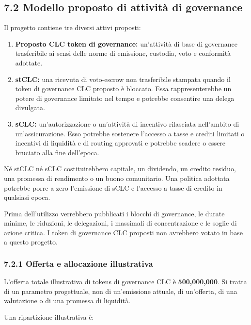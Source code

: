 \documentclass[11pt]{article}
\begin{document}
\subsection*{7.2 Modello proposto di attività di governance}

Il progetto contiene tre diversi attivi proposti:

\begin{enumerate}[leftmargin=*]
\item \textbf{Proposto CLC token di governance:} un'attività di base di governance trasferibile ai sensi delle norme di emissione, custodia, voto e conformità adottate.
\item \textbf{stCLC:} una ricevuta di voto-escrow non trasferibile stampata quando il token di governance CLC proposto è bloccato. Essa rappresenterebbe un potere di governance limitato nel tempo e potrebbe consentire una delega divulgata.
\item \textbf{sCLC:} un'autorizzazione o un'attività di incentivo rilasciata nell'ambito di un'assicurazione. Esso potrebbe sostenere l'accesso a tasse e crediti limitati o incentivi di liquidità e di routing approvati e potrebbe scadere o essere bruciato alla fine dell'epoca.
\end{enumerate}
Né stCLC né sCLC costituirebbero capitale, un dividendo, un credito residuo, una promessa di rendimento o un buono comunitario. Una politica adottata potrebbe porre a zero l'emissione di sCLC e l'accesso a tasse di credito in qualsiasi epoca.

Prima dell'utilizzo verrebbero pubblicati i blocchi di governance, le durate minime, le riduzioni, le delegazioni, i massimali di concentrazione e le soglie di azione critica. I token di governance CLC proposti non avrebbero votato in base a questo progetto.

\subsubsection*{7.2.1 Offerta e allocazione illustrativa}

L'offerta totale illustrativa di tokens di governance CLC è \textbf{500,000,000}. Si tratta di un parametro progettuale, non di un'emissione attuale, di un'offerta, di una valutazione o di una promessa di liquidità.

Una ripartizione illustrativa è:
\end{document}
